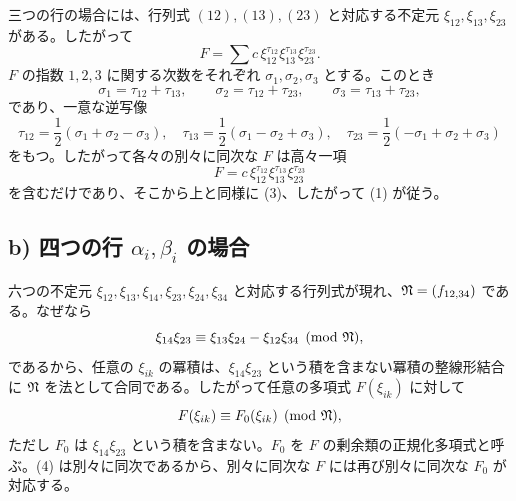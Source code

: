 三つの行の場合には、行列式 \((12),(13),(23)\) と対応する不定元 \(\xi_{12},\xi_{13},\xi_{23}\) がある。したがって
\[
        F=\sum c\,\xi_{12}^{\tau_{12}}\xi_{13}^{\tau_{13}}\xi_{23}^{\tau_{23}}.
\]
\(F\) の指数 \(1,2,3\) に関する次数をそれぞれ \(\sigma_1,\sigma_2,\sigma_3\) とする。このとき
\[
        \sigma_1=\tau_{12}+\tau_{13},\qquad
        \sigma_2=\tau_{12}+\tau_{23},\qquad
        \sigma_3=\tau_{13}+\tau_{23},
\]
であり、一意な逆写像
\[
        \tau_{12}=\frac12(\sigma_1+\sigma_2-\sigma_3),\quad
        \tau_{13}=\frac12(\sigma_1-\sigma_2+\sigma_3),\quad
        \tau_{23}=\frac12(-\sigma_1+\sigma_2+\sigma_3)
\]
をもつ。したがって各々の別々に同次な \(F\) は高々一項
\[
        F=c\,\xi_{12}^{\tau_{12}}\xi_{13}^{\tau_{13}}\xi_{23}^{\tau_{23}}
\]
を含むだけであり、そこから上と同様に (3)、したがって (1) が従う。

\subsection*{b) 四つの行 \(\alpha_i,\beta_i\) の場合}

六つの不定元 \(\xi_{12},\xi_{13},\xi_{14},\xi_{23},\xi_{24},\xi_{34}\) と対応する行列式が現れ、\(\mathfrak N=(f_{12,34})\) である。なぜなら
\begin{equation}
        \xi_{14}\xi_{23}\equiv \xi_{13}\xi_{24}-\xi_{12}\xi_{34}\pmod{\mathfrak N},
\end{equation}
であるから、任意の \(\xi_{ik}\) の冪積は、\(\xi_{14}\xi_{23}\) という積を含まない冪積の整線形結合に \(\mathfrak N\) を法として合同である。したがって任意の多項式 \(F(\xi_{ik})\) に対して
\begin{equation}
        F(\xi_{ik})\equiv F_0(\xi_{ik})\pmod{\mathfrak N},
\end{equation}
ただし \(F_0\) は \(\xi_{14}\xi_{23}\) という積を含まない。\(F_0\) を \(F\) の剰余類の正規化多項式と呼ぶ。(4) は別々に同次であるから、別々に同次な \(F\) には再び別々に同次な \(F_0\) が対応する。

